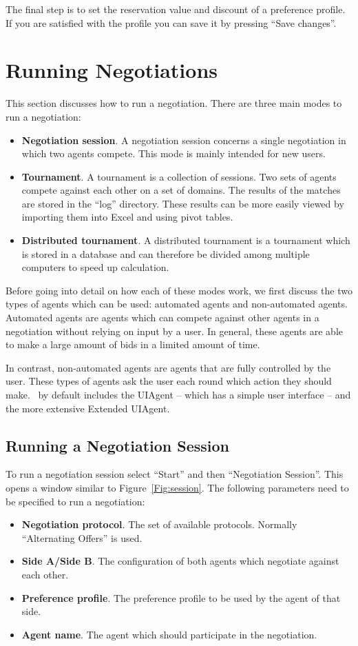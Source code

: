 \documentclass[]{article}
\begin{document}
The final step is to set the reservation value and discount of a preference profile. If you are satisfied with the profile you can save it by pressing ``Save changes''. 

\section{Running Negotiations}
This section discusses how to run a negotiation. There are three main modes to run a negotiation:

\begin{itemize}
	\item \textbf{Negotiation session}. A negotiation session concerns a single negotiation in which two agents compete. This mode is mainly intended for new users.
	\item \textbf{Tournament}. A tournament is a collection of sessions. Two sets of agents compete against each other on a set of domains. The results of the matches are stored in the ``log'' directory. These results can be more easily viewed by importing them into Excel and using pivot tables.
	\item \textbf{Distributed tournament}. A distributed tournament is a tournament which is stored in a database and can therefore be divided among multiple computers to speed up calculation.
\end{itemize}

Before going into detail on how each of these modes work, we first discuss the two types of agents which can be used: automated agents and non-automated agents. Automated agents are agents which can compete against other agents in a negotiation without relying on input by a user. In general, these agents are able to make a large amount of bids in a limited amount of time.

In contrast, non-automated agents are agents that are fully controlled by the user. These types of agents ask the user each round which action they should make. \Genius~by default includes the UIAgent -- which has a simple user interface -- and the more extensive Extended UIAgent.


\subsection{Running a Negotiation Session}
To run a negotiation session select ``Start'' and then ``Negotiation Session''. This opens a window similar to Figure~\ref{Fig:session}. The following parameters need to be specified to run a negotiation:
\begin{itemize}
	\item \textbf{Negotiation protocol}. The set of available protocols. Normally ``Alternating Offers'' is used.
	\item \textbf{Side A/Side B}. The configuration of both agents which negotiate against each other.
	\item \textbf{Preference profile}. The preference profile to be used by the agent of that side.
	\item \textbf{Agent name}. The agent which should participate in the negotiation.
\end{itemize}
\end{document}
